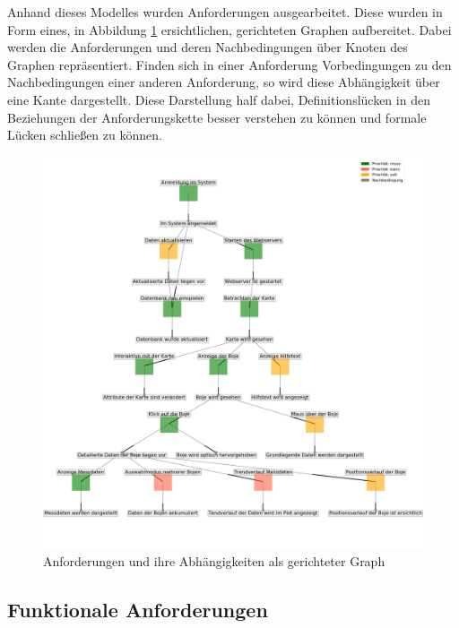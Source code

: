     Anhand dieses Modelles  wurden Anforderungen ausgearbeitet. Diese wurden in Form eines, in Abbildung \ref{fig:graph_anforderungen} ersichtlichen, gerichteten Graphen aufbereitet. Dabei werden die Anforderungen und deren Nachbedingungen über Knoten des Graphen repräsentiert. Finden sich in einer Anforderung Vorbedingungen zu den Nachbedingungen einer anderen Anforderung, so wird diese Abhängigkeit über eine Kante dargestellt. Diese Darstellung half dabei, Definitionslücken in den Beziehungen  der Anforderungskette besser verstehen zu können und formale Lücken schließen zu können.

    \begin{figure}[h!]
    \centering
    \includegraphics[width=\textwidth]{pix/graph_anforderungen.png}
    \caption{Anforderungen und ihre Abhängigkeiten als gerichteter Graph}
    \label{fig:graph_anforderungen}
    \end{figure}

\pagebreak
    \subsection{Funktionale Anforderungen}

